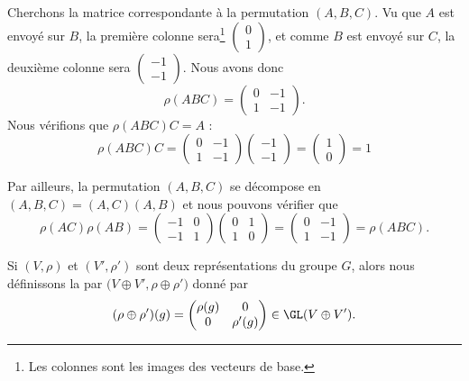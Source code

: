 \begin{example}
	Cherchons la matrice correspondante à la permutation \( (A,B,C)\). Vu que \( A\) est envoyé sur \( B\), la première colonne sera\footnote{Les colonnes sont les images des vecteurs de base.} \( \begin{pmatrix}
		0 \\
		1
	\end{pmatrix}\), et comme \( B\) est envoyé sur \( C\), la deuxième colonne sera \( \begin{pmatrix}
		-1 \\
		-1
	\end{pmatrix}\). Nous avons donc
	\begin{equation}
		\rho(ABC)=\begin{pmatrix}
			0 & -1 \\
			1 & -1
		\end{pmatrix}.
	\end{equation}
	Nous vérifions que \( \rho(ABC)C=A\) :
	\begin{equation}
		\rho(ABC)C=
		\begin{pmatrix}
			0 & -1 \\
			1 & -1
		\end{pmatrix}\begin{pmatrix}
			-1 \\
			-1
		\end{pmatrix}=\begin{pmatrix}
			1 \\
			0
		\end{pmatrix}=1
	\end{equation}

	Par ailleurs, la permutation \( (A,B,C)\) se décompose en \( (A,B,C)=(A,C)(A,B)\) et nous pouvons vérifier que
	\begin{equation}
		\rho(AC)\rho(AB)=\begin{pmatrix}
			-1 & 0 \\
			-1 & 1
		\end{pmatrix}\begin{pmatrix}
			0 & 1 \\
			1 & 0
		\end{pmatrix}=\begin{pmatrix}
			0 & -1 \\
			1 & -1
		\end{pmatrix}=\rho(ABC).
	\end{equation}
\end{example}

\begin{definition}
	Si \( (V,\rho)\) et \( (V',\rho')\) sont deux représentations du groupe \( G\), alors nous définissons la  par \( \big( V\oplus V',\rho\oplus\rho' \big)\) donné par
	\begin{equation}
		(\rho\oplus\rho')(g)=\begin{pmatrix}
			\rho(g) & 0        \\
			0       & \rho'(g)
		\end{pmatrix}\in \GL(V\oplus V').
	\end{equation}
\end{definition}

